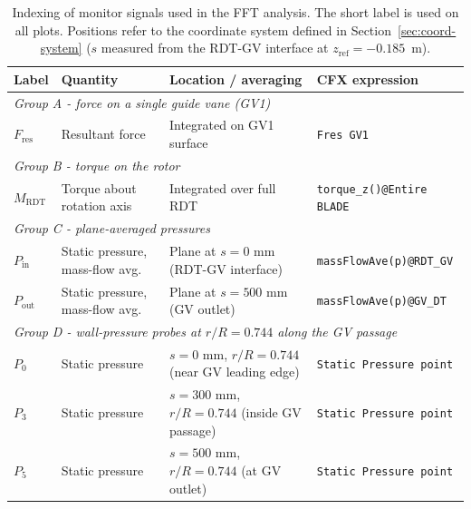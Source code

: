 \begin{table}[H]
\centering
\small
\caption{Indexing of monitor signals used in the FFT analysis. The short label is used on all plots. Positions refer to the coordinate system defined in Section~\ref{sec:coord-system} ($s$ measured from the RDT-GV interface at $z_{\mathrm{ref}} = -0.185$~m).}
\label{tab:monitor-index}
\begin{tabular}{p{} p{} p{} p{}}
\hline
Label & Quantity & Location / averaging & CFX expression \\ \hline
\multicolumn{4}{l}{\textit{Group A - force on a single guide vane (GV1)}} \\
$F_{\mathrm{res}}$ & Resultant force & Integrated on GV1 surface & \texttt{Fres GV1} \\[0.4em]

\multicolumn{4}{l}{\textit{Group B - torque on the rotor}} \\
$M_{\mathrm{RDT}}$ & Torque about rotation axis & Integrated over full RDT & \texttt{torque\_z()@Entire BLADE} \\[0.4em]

\multicolumn{4}{l}{\textit{Group C - plane-averaged pressures}} \\
$P_{\mathrm{in}}$ & Static pressure, mass-flow avg. & Plane at $s = 0$ mm (RDT-GV interface) & \texttt{massFlowAve(p)@RDT\_GV} \\
$P_{\mathrm{out}}$ & Static pressure, mass-flow avg. & Plane at $s = 500$ mm (GV outlet) & \texttt{massFlowAve(p)@GV\_DT} \\[0.4em]

\multicolumn{4}{l}{\textit{Group D - wall-pressure probes at $r/R = 0.744$ along the GV passage}} \\
$P_0$ & Static pressure & $s = 0$ mm, $r/R = 0.744$ (near GV leading edge) & \texttt{Static Pressure point} \\
$P_3$ & Static pressure & $s = 300$ mm, $r/R = 0.744$ (inside GV passage) & \texttt{Static Pressure point} \\
$P_5$ & Static pressure & $s = 500$ mm, $r/R = 0.744$ (at GV outlet) & \texttt{Static Pressure point} \\ \hline
\end{tabular}
\end{table}
 
